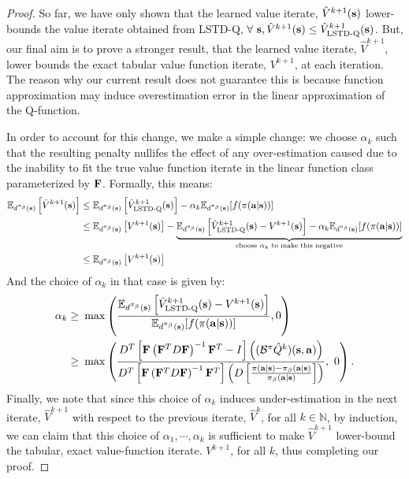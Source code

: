 \begin{proof}
So far, we have only shown that the learned value iterate, $\hat{V}^{k+1}(\mathbf{s})$ lower-bounds the value iterate obtained from LSTD-Q, $\forall ~\mathbf{s}, \hat{V}^{k+1}(\mathbf{s}) \leq \hat{V}^{k+1}_{\text{LSTD-Q}}(\mathbf{s})$. But, our final aim is to prove a stronger result, that the learned value iterate, $\hat{V}^{k+1}$, lower bounds the exact tabular value function iterate, ${V}^{k+1}$, at each iteration. The reason why our current result does not guarantee this is because function approximation may induce overestimation error in the linear approximation of the Q-function.

In order to account for this change, we make a simple change: we choose $\alpha_k$ such that the resulting penalty nullifes the effect of any over-estimation caused due to the inability to fit the true value function iterate in the linear function class parameterized by $\mathbf{F}$. Formally, this means:
\begin{align*}
    \mathbb{E}_{d^{\pi_\beta}(\mathbf{s})}\left[\hat{V}^{k+1}(\mathbf{s})\right] &\leq \mathbb{E}_{d^{\pi_\beta}(\mathbf{s})}\left[\hat{V}^{k+1}_{\text{LSTD-Q}}(\mathbf{s})\right] - \alpha_k \mathbb{E}_{d^{\pi_\beta}(\mathbf{s})}[f(\pi(\mathbf{a}|\mathbf{s}))] \\
    & \leq \mathbb{E}_{d^{\pi_\beta}(\mathbf{s})}\left[V^{k+1}(\mathbf{s})\right] - \underbrace{\mathbb{E}_{d^{\pi_\beta}(\mathbf{s})}\left[\hat{V}^{k+1}_{\text{LSTD-Q}}(\mathbf{s}) - V^{k+1}(\mathbf{s}) \right] - \alpha_k \mathbb{E}_{d^{\pi_\beta}(\mathbf{s})}[f(\pi(\mathbf{a}|\mathbf{s}))]}_{\text{choose~} \alpha_k \text{~to make this negative}} \\
    & \leq \mathbb{E}_{d^{\pi_\beta}(\mathbf{s})}\left[V^{k+1}(\mathbf{s})\right]
\end{align*}
And the choice of $\alpha_k$ in that case is given by:
\begin{align*}
    \alpha_k \geq& ~ \max \left(\frac{\mathbb{E}_{d^{\pi_\beta}(\mathbf{s})}\left[\hat{V}^{k+1}_{\text{LSTD-Q}}(\mathbf{s}) - V^{k+1}(\mathbf{s}) \right]}{\mathbb{E}_{d^{\pi_\beta}(\mathbf{s})}[f(\pi(\mathbf{a}|\mathbf{s}))]}, 0 \right)\\
    \geq& ~ \max \left(\frac{D^T\left[\mathbf{F} \left(\mathbf{F}^T D \mathbf{F} \right)^{-1} \mathbf{F}^T - I \right]\left((\mathcal{B}^\pi \hat{Q}^k)(\mathbf{s}, \mathbf{a})\right)}{D^T\left[ \mathbf{F} \left(\mathbf{F}^T D \mathbf{F} \right)^{-1} \mathbf{F}^T \right] \left(D \left[\frac{\pi(\mathbf{a}|\mathbf{s}) - {\pi_\beta}(\mathbf{a}|\mathbf{s})}{{\pi_\beta}(\mathbf{a}|\mathbf{s})} \right] \right)},~ 0 \right).
\end{align*}
Finally, we note that since this choice of $\alpha_k$ induces under-estimation in the next iterate, $\hat{V}^{k+1}$ with respect to the previous iterate, $\hat{V}^k$, for all $k \in \mathbb{N}$, by induction, we can claim that this choice of $\alpha_1, \cdots, \alpha_k$ is sufficient to make $\hat{V}^{k+1}$ lower-bound the tabular, exact value-function iterate. $V^{k+1}$, for all $k$, thus completing our proof.
\end{proof}

